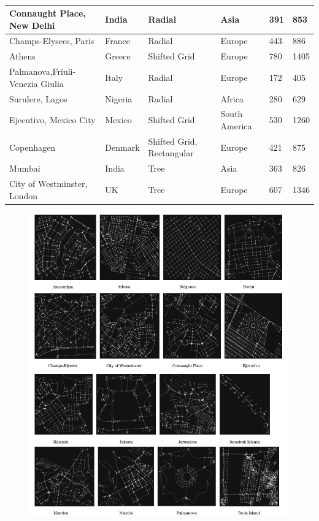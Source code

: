 \begin{landscape}
\begin{table}[]
\begin{tabular}{|l|l|l|l|l|l|}
Connaught Place, New Delhi      & India       & Radial                    & Asia          & 391  & 853  \\ \hline
Champs-Elysees, Paris           & France      & Radial                    & Europe        & 443  & 886  \\ \hline
Athens                          & Greece      & Shifted Grid              & Europe        & 780  & 1405 \\ \hline
Palmanova,Friuli-Venezia Giulia & Italy       & Radial                    & Europe        & 172  & 405  \\ \hline
Surulere, Lagos                 & Nigeria     & Radial                    & Africa        & 280  & 629  \\ \hline
Ejecutivo, Mexico City          & Mexico      & Shifted Grid              & South America & 530  & 1260 \\ \hline
Copenhagen                      & Denmark     & Shifted Grid, Rectangular & Europe        & 421  & 875  \\ \hline
Mumbai                          & India       & Tree                      & Asia          & 363  & 826  \\ \hline
City of Westminster, London     & UK          & Tree                      & Europe        & 607  & 1346 \\ \hline
\end{tabular}
\caption{}
\label{tab:Selected Cities}
\end{table}
\end{landscape}

\begin{figure}[h!]
\centering
\includegraphics[width=1.0\textwidth,center]{picture/Graphs1.png}
\end{figure}

